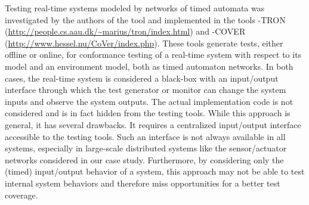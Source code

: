 Testing real-time systems modeled by networks of timed automata was
investigated by the authors of the tool \uppaal
\cite{uppaaltron2008,uppaalcover2007,uppaaltron2005} and implemented
in the tools \uppaal-TRON
(\url{http://people.cs.aau.dk/~marius/tron/index.html}) and
\uppaal-COVER
 (\url{http://www.hessel.nu/CoVer/index.php}).  These tools generate
tests, either offline or online, for conformance testing of a
real-time system with respect to its model and an environment model,
both as timed automaton networks.  In both cases, the real-time system
is considered a black-box with an input/output interface through which
the test generator or monitor can change the system inputs and observe
the system outputs.  The actual implementation code is not considered
and is in fact hidden from the testing tools.  While this approach is
general, it has several drawbacks.  It requires a centralized
input/output interface accessible to the testing tools.  Such an
interface is not always available in all systems, especially in
large-scale distributed systems like the sensor/actuator networks
considered in our case study.  Furthermore, by considering only the
(timed) input/output behavior of a system, this approach may not be
able to test internal system behaviors and therefore miss
opportunities for a better test
coverage.



